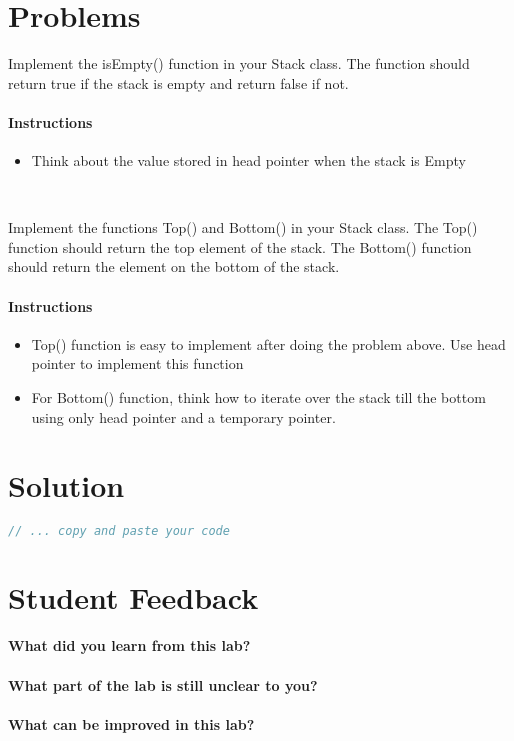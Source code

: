 \documentclass[11pt,fleqn]{book} %
\begin{document}
\section{Problems}
\begin{problem}
  Implement the isEmpty() function in your Stack class. The function should return true if the stack is empty and return false if not.
  \paragraph{Instructions}
  \begin{itemize}
  \item Think about the value stored in head pointer when the stack is Empty
  \end{itemize}
\end{problem}
~\\
\begin{problem}
  Implement the  functions Top() and Bottom() in your Stack class. The Top() function should return the top element of the stack. The Bottom() function should return the element on the bottom of the stack.
  \paragraph{Instructions}
  \begin{itemize}
  \item Top() function is easy to implement after doing the problem above. Use head pointer to implement this function
  \item For Bottom() function, think how to iterate over the stack till the bottom using only head pointer and a temporary pointer.
  \end{itemize}
\end{problem}

\newpage
\section{Solution}
\begin{lstlisting}[language=C++]
  // ... copy and paste your code
\end{lstlisting}

\newpage
\section{Student Feedback}
\textbf{What did you learn from this lab?}\\
\noindent\fbox{\parbox{\textwidth}{
  }
}\\
\textbf{What part of the lab is still unclear to you?}\\
\noindent\fbox{\parbox{\textwidth}{
  }
}\\
\textbf{What can be improved in this lab?}\\ 
\noindent\fbox{\parbox{\textwidth}{
  }
}\\
\end{document}
